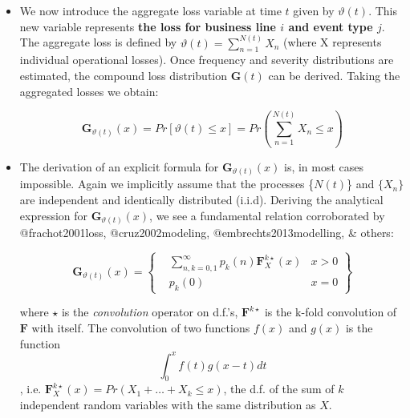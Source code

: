 \documentclass{DissertateUSU}
\begin{document}
\begin{itemize}
\item We now introduce the aggregate loss variable at time $t$ given by $\vartheta(t)$. This new variable represents \textbf{the loss for business line $i$ and event type $j$}. The aggregate loss is defined by \begin{math} \vartheta(t) = \sum_{n=1}^{N(t)} X_{n} \end{math} (where X represents individual operational losses). Once frequency and severity distributions are estimated, the compound loss distribution \begin{math} \mathbf{G}(t)\end{math} can be derived.  Taking the aggregated losses we obtain:

\singlespacing
\begin{equation}\label{eqn6}
\mathbf{G}_{\vartheta(t)}(x)=Pr[\vartheta(t)\leq x]=Pr\left(\sum_{n=1}^{N(t)}X_{n} \leq x\right)
\end{equation}
\doublespacing

\item The derivation of an explicit formula for \begin{math}\mathbf{G}_{\vartheta(t)}(x) \end{math} is, in most cases impossible. Again we implicitly assume that the processes \{$N(t)$\} and $\{X_{n}\}$ are independent and identically distributed (i.i.d).  Deriving the analytical expression for \begin{math}\mathbf{G}_{\vartheta(t)}(x) \end{math}, we see a fundamental relation corroborated by @frachot2001loss, @cruz2002modeling, @embrechts2013modelling, \& others:

\singlespacing
\begin{equation}\label{eqn7}
\mathbf {G}_{\vartheta(t)}(x)=\left\{\begin{array}{rcl}
                 &\sum_{n,k=0,1}^{\infty} p_{k}(n)\mathbf{F}_{X}^{k\star}(x) &x>0\\ &p_{k}(0) &x=0
                 \end{array}\right\}
\end{equation}
\doublespacing

where $\star $ is the \emph{convolution} operator on d.f.'s, \begin{math}\mathbf{F}^{k\star} \end{math} is the k-fold convolution of \begin{math}\mathbf{F} \end{math} with itself. The convolution of two functions $f(x)$ and $g(x)$ is the function
\singlespacing
\begin{equation}
\int_{0}^{x}f(t)g(x-t)dt
\end{equation}
\doublespacing , i.e. \begin{math} \mathbf{F}_{X}^{k\star}(x)=Pr(X_1 + \ldots + X_k \leq x) \end{math}, the d.f. of the sum of $k$ independent random variables with the same distribution as $X$. 


\end{itemize}
\end{document}
